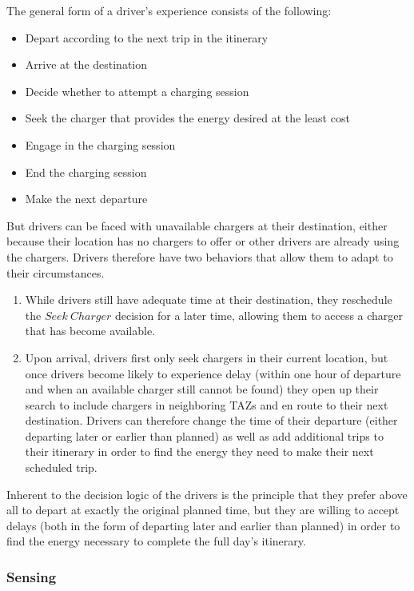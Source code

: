 \documentclass[journal]{IEEEtran}
\begin{document}
The general form of a driver's experience consists of the following:
\begin{itemize}
  \item	Depart according to the next trip in the itinerary
  \item	Arrive at the destination
  \item	Decide whether to attempt a charging session
  \item	Seek the charger that provides the energy desired at the least cost
  \item	Engage in the charging session
  \item	End the charging session
  \item	Make the next departure
\end{itemize}

But drivers can be faced with unavailable chargers at their destination, either because their location has no chargers to offer or other drivers are already using the chargers.  Drivers therefore have two behaviors that allow them to adapt to their circumstances.  
\begin{enumerate}
  \item	While drivers still have adequate time at their destination, they reschedule the $Seek ~Charger$ decision for a later time, allowing them to access a charger that has become available.
\item	Upon arrival, drivers first only seek chargers in their current location, but once drivers become likely to experience delay (within one hour of departure and when an available charger still cannot be found) they open up their search to include chargers in neighboring TAZs and en route to their next destination.  Drivers can therefore change the time of their departure (either departing later or earlier than planned) as well as add additional trips to their itinerary in order to find the energy they need to make their next scheduled trip. 
\end{enumerate}

Inherent to the decision logic of the drivers is the principle that they prefer above all to depart at exactly the original planned time, but they are willing to accept delays (both in the form of departing later and earlier than planned) in order to find the energy necessary to complete the full day's itinerary.    

\subsubsection{Sensing}
\end{document}
